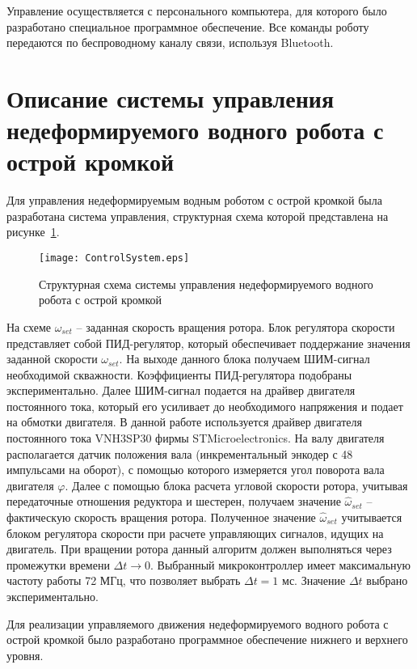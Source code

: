 Управление осуществляется с персонального компьютера, для которого было разработано специальное программное обеспечение. Все команды роботу передаются по беспроводному каналу связи, используя Bluetooth.


\section{Описание системы управления недеформируемого водного робота с острой кромкой}

Для управления недеформируемым водным роботом с острой кромкой была разработана система управления, структурная схема которой представлена на рисунке~\ref{ControlSystem}.

\begin{figure}[!h]
	\centering
	\texttt{[image: ControlSystem.eps]}
	\caption{Структурная схема системы управления недеформируемого водного робота с острой кромкой}
	\label{ControlSystem}
\end{figure}

На схеме $ \omega_{set} $ -- заданная скорость вращения ротора. Блок регулятора скорости представляет собой ПИД-регулятор, который обеспечивает поддержание значения заданной скорости $ \omega_{set} $. На выходе данного блока получаем ШИМ-сигнал необходимой скважности. Коэффициенты ПИД-регулятора подобраны экспериментально. Далее ШИМ-сигнал подается на драйвер двигателя постоянного тока, который его усиливает до необходимого напряжения и подает на обмотки двигателя. В данной работе используется драйвер двигателя постоянного тока VNH3SP30 фирмы STMicroelectronics. На валу двигателя располагается датчик положения вала (инкрементальный энкодер с 48 импульсами на оборот), с помощью которого измеряется угол поворота вала двигателя $ \varphi $. Далее с помощью блока расчета угловой скорости ротора, учитывая передаточные отношения редуктора и шестерен, получаем значение $ \hat{\omega}_{set} $ -- фактическую скорость вращения ротора. Полученное значение $ \hat{\omega}_{set} $ учитывается блоком регулятора скорости при расчете управляющих сигналов, идущих на двигатель. При вращении ротора данный алгоритм должен выполняться через промежутки времени $ \Delta t \rightarrow 0 $. Выбранный микроконтроллер имеет максимальную частоту работы 72 МГц, что позволяет выбрать $ \Delta t = 1 $ мс. Значение $ \Delta t $ выбрано экспериментально.

Для реализации управляемого движения недеформируемого водного робота с острой кромкой было разработано программное обеспечение нижнего и верхнего уровня.

